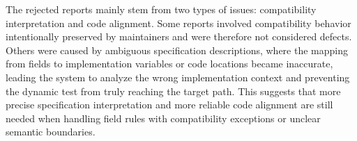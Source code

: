 The rejected reports mainly stem from two types of issues: compatibility 
interpretation and code alignment. Some reports involved compatibility 
behavior intentionally preserved by maintainers and were therefore not 
considered defects. Others were caused by ambiguous specification descriptions, 
where the mapping from fields to implementation variables or code locations 
became inaccurate, leading the system to analyze the wrong implementation 
context and preventing the dynamic test from truly reaching the target path. 
This suggests that more precise specification interpretation and more reliable 
code alignment are still needed when handling field rules with compatibility 
exceptions or unclear semantic boundaries.
